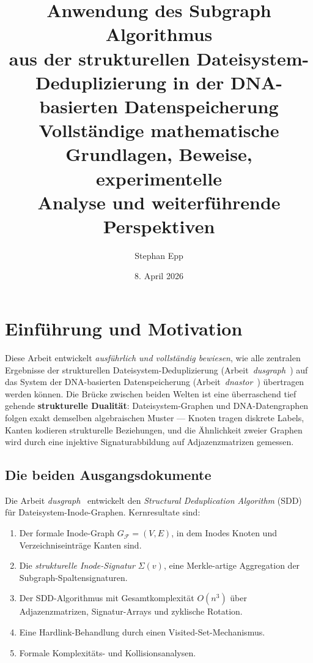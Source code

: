 ﻿\documentclass[a4paper,12pt]{article}
\title{%
  \textbf{Anwendung des Subgraph Algorithmus \\aus der strukturellen
  Dateisystem-Deduplizierung in der DNA-basierten Datenspeicherung}\\[0.6em]
  \large Vollständige mathematische Grundlagen, Beweise, experimentelle\\
  Analyse und weiterführende Perspektiven}
\author{Stephan Epp}
\date{8. April 2026}
\theoremstyle{definition}
\theoremstyle{plain}
\begin{document}
\setlength{\emergencystretch}{3em}
\maketitle
\tableofcontents
\newpage

\section{Einführung und Motivation}
\label{sec:einf}

Diese Arbeit entwickelt \emph{ausführlich und vollständig bewiesen}, wie alle
zentralen Ergebnisse der strukturellen Dateisystem-Deduplizierung
(Arbeit~\textit{dusgraph}~\cite{dusgraph}) auf das System der DNA-basierten
Datenspeicherung (Arbeit~\textit{dnastor}~\cite{dnastor}) übertragen werden
können.  Die Brücke zwischen beiden Welten ist eine überraschend tief
gehende \textbf{strukturelle Dualität}: Dateisystem-Graphen und
DNA-Datengraphen folgen exakt demselben algebraischen Muster ---
Knoten tragen diskrete Labels, Kanten kodieren strukturelle
Beziehungen, und die Ähnlichkeit zweier Graphen wird durch
eine injektive Signaturabbildung auf Adjazenzmatrizen gemessen.

\subsection{Die beiden Ausgangsdokumente}

Die Arbeit \textit{dusgraph}~\cite{dusgraph} entwickelt den
\emph{Structural Deduplication Algorithm} (SDD) für Dateisystem-Inode-Graphen.
Kernresultate sind:
\begin{enumerate}
  \item Der formale Inode-Graph $G_\mathcal{F} = (V,E)$, in dem Inodes
        Knoten und Verzeichniseinträge Kanten sind.
  \item Die \emph{strukturelle Inode-Signatur} $\Sigma(v)$, eine
        Merkle-artige Aggregation der Subgraph-Spaltensignaturen.
  \item Der SDD-Algorithmus mit Gesamtkomplexität $O(n^3)$ über
        Ad\-ja\-zenz\-ma\-tri\-zen, Signatur-Arrays und zyklische Rotation.
  \item Eine Hardlink-Behandlung durch einen Visited-Set-Mechanismus.
  \item Formale Komplexitäts- und Kollisionsanalysen.
\end{enumerate}
\end{document}
